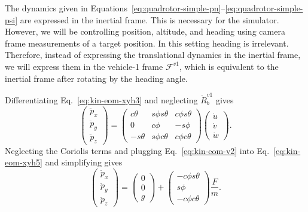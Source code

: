 {The dynamics given in
Equations~\eqref{eq:quadrotor-simple-pn}--\eqref{eq:quadrotor-simple-psi}
are expressed in the inertial frame.  This is necessary for the
simulator.  However, we will be controlling position, altitude, and
heading using camera frame measurements of a target position.  In
this setting heading is irrelevant.  Therefore, instead of
expressing the translational dynamics in the inertial frame, we will
express them in the vehicle-1 frame $\mathcal{F}^{v1}$, which is
equivalent to the inertial frame after rotating by the heading
angle.

Differentiating Eq.~\eqref{eq:kin-eom-xyh3} and neglecting
$\dot{R}_b^{v1}$ gives
\begin{equation}\label{eq:kin-eom-xyh5}
\begin{pmatrix} \ddot{p}_x \\ \ddot{p}_y \\ \ddot{p}_z \end{pmatrix}
= \begin{pmatrix} c\theta & s\phi s\theta
    & c\phi s\theta \\
    0 &  c\phi
    & - s\phi  \\
    -s\theta & s\phi c\theta & c\phi c\theta
    \end{pmatrix}
    \begin{pmatrix} \dot{u} \\ \dot{v} \\ \dot{w} \end{pmatrix}.
\end{equation}
Neglecting the Coriolis terms and plugging Eq.~\eqref{eq:kin-eom-v2}
into Eq.~\eqref{eq:kin-eom-xyh5} and simplifying gives
\begin{equation}\label{eq:kin-xyh-ddot}
\begin{pmatrix} \ddot{p}_x \\ \ddot{p}_y \\ \ddot{p}_z \end{pmatrix}
= \begin{pmatrix} 0 \\ 0 \\ g \end{pmatrix} +
\begin{pmatrix}
    -c\phi s\theta \\
    s\phi \\
    -c\phi c\theta
    \end{pmatrix}
    \frac{F}{m}.
\end{equation}

}
